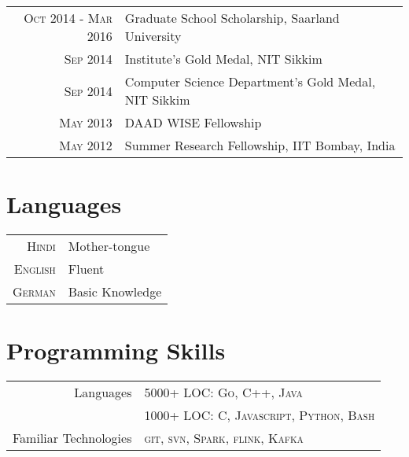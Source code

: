 \documentclass[a4paper,10pt]{article} %
\begin{document}
\begin{tabular}{rl}
\textsc{Oct 2014 - Mar 2016} & Graduate School Scholarship, Saarland University\\
\textsc{Sep 2014} & Institute's Gold Medal, NIT Sikkim\\
\textsc{Sep 2014} & Computer Science Department's Gold Medal, NIT Sikkim\\
\textsc{May} 2013 & DAAD WISE Fellowship\\
\textsc{May} 2012 & Summer Research Fellowship, IIT Bombay, India\\
\end{tabular}

\vspace{1cm}

\renewcommand\refname{Publications}
\setlength\bibitemsep{\baselineskip}


\nocite{*}


\section{Languages}

\begin{tabular}{rl}
\textsc{Hindi} & Mother-tongue\\
\textsc{English} & Fluent\\
\textsc{German} & Basic Knowledge\\
\end{tabular}


\section{Programming Skills}

\begin{tabular}{rl}
Languages & 5000+ LOC: \textsc{Go}, \textsc{C++}, \textsc{Java}\\
		  & 1000+ LOC: \textsc{C}, \textsc{Javascript}, \textsc{Python}, \textsc{Bash}\\
		  
Familiar Technologies & \textsc{git},  \textsc{svn},  \textsc{Spark},  \textsc{flink},  \textsc{Kafka} 
\end{tabular}
\end{document}

